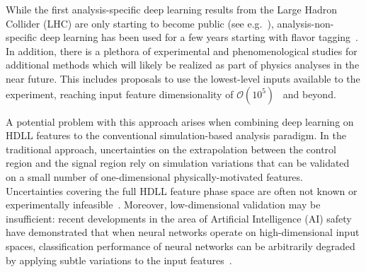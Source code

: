 \documentclass[reprint,nofootinbib,...]{revtex4-1}
\begin{document}
While the first analysis-specific deep learning results from the Large Hadron Collider (LHC) are only starting to become public (see e.g.~\cite{Aad:2019yxi,ATLAS-CONF-2019-017,CMS-PAS-SUS-19-009}), analysis-non-specific deep learning has been used for a few years starting with flavor tagging~\cite{CMS-DP-2017-005,ATL-PHYS-PUB-2017-003}.  In addition, there is a plethora of experimental and phenomenological studies for additional methods which will likely be realized as part of physics analyses in the near future.  This includes proposals to use the lowest-level inputs available to the experiment, reaching input feature dimensionality of $\mathcal{O}(10^5)$~\cite{Andrews:2018nwy,Andrews:2019faz} and beyond.  %


A potential problem with this approach arises when combining deep learning on HDLL features to the conventional simulation-based analysis paradigm.  In the traditional approach, uncertainties on the extrapolation between the control region and the signal region rely on simulation variations that can be validated on a small number of one-dimensional physically-motivated features.  Uncertainties covering the full HDLL feature phase space are often not known or experimentally infeasible~\cite{Nachman:2019dol}. %
Moreover, low-dimensional validation may be insufficient: recent developments in the area of Artificial Intelligence (AI) safety have demonstrated that when neural networks operate on high-dimensional input spaces, classification performance of neural networks can be arbitrarily degraded by applying subtle variations to the input features~\cite{Szegedy14intriguingproperties,DBLP:journals/corr/GoodfellowSS14}.
\end{document}
